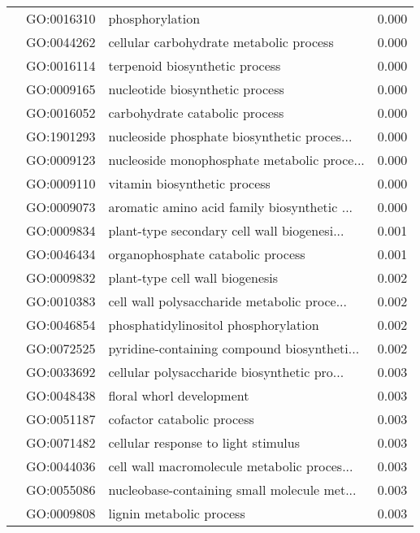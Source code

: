 \begin{longtable}{lllr}
   & GO:0016310 &                              phosphorylation &         0.000 \\
   & GO:0044262 &      cellular carbohydrate metabolic process &         0.000 \\
   & GO:0016114 &               terpenoid biosynthetic process &         0.000 \\
   & GO:0009165 &              nucleotide biosynthetic process &         0.000 \\
   & GO:0016052 &               carbohydrate catabolic process &         0.000 \\
   & GO:1901293 &  nucleoside phosphate biosynthetic proces... &         0.000 \\
   & GO:0009123 &  nucleoside monophosphate metabolic proce... &         0.000 \\
   & GO:0009110 &                 vitamin biosynthetic process &         0.000 \\
   & GO:0009073 &  aromatic amino acid family biosynthetic ... &         0.000 \\
   & GO:0009834 &  plant-type secondary cell wall biogenesi... &         0.001 \\
   & GO:0046434 &            organophosphate catabolic process &         0.001 \\
   & GO:0009832 &              plant-type cell wall biogenesis &         0.002 \\
   & GO:0010383 &  cell wall polysaccharide metabolic proce... &         0.002 \\
   & GO:0046854 &         phosphatidylinositol phosphorylation &         0.002 \\
   & GO:0072525 &  pyridine-containing compound biosyntheti... &         0.002 \\
   & GO:0033692 &  cellular polysaccharide biosynthetic pro... &         0.003 \\
   & GO:0048438 &                     floral whorl development &         0.003 \\
   & GO:0051187 &                   cofactor catabolic process &         0.003 \\
   & GO:0071482 &          cellular response to light stimulus &         0.003 \\
   & GO:0044036 &  cell wall macromolecule metabolic proces... &         0.003 \\
   & GO:0055086 &  nucleobase-containing small molecule met... &         0.003 \\
   & GO:0009808 &                     lignin metabolic process &         0.003 \\

\end{longtable}
